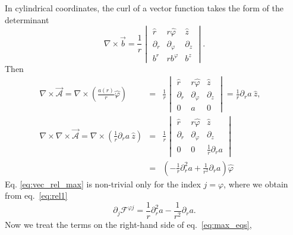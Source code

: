 In cylindrical coordinates, the curl of a vector function takes the form of the determinant \cite{Arfken}
\begin{equation}
	\nabla\times\vec{b} = \frac{1}{r}\begin{vmatrix}
	\hat{r} & r{\hat{\varphi}} & \hat{z} \\
	\partial_r & \partial_{\varphi} & \partial_z \\
	b^r & rb^{\varphi} & b^z 
	\end{vmatrix}.
\end{equation}
Then
\begin{eqnarray}
	\nabla\times\vec{\mathcal{A}} = \nabla\times\left( \frac{a(r)}{r}\hat{\varphi}\right) & = & \frac{1}{r} \begin{vmatrix}
	\hat{r} & r\hat{\varphi} & \hat{z} \\
	\partial_r & \partial_{\varphi} & \partial_z \\
	0 & a & 0
	\end{vmatrix} = \frac{1}{r}\partial_r a \ \hat{z}, \nonumber \quad\\
	\nabla \times \nabla \times \vec{\mathcal{A}} = \nabla \times \left(\frac{1}{r}\partial_r a \ \hat{z}\right) & = & \frac{1}{r}\begin{vmatrix}
	\hat{r} & r\hat{\varphi} & \hat{z} \\
	\partial_r & \partial_{\varphi} & \partial_z \\
	\label{eq:rel1}
	0 & 0 & \frac{1}{r}\partial_r a 
	\end{vmatrix}\nonumber \\
	& = & \left(-\frac{1}{r}\partial_r^2 a + \frac{1}{r^2}\partial_r a\right)\hat{\varphi} \quad
\end{eqnarray}
Eq. \eqref{eq:vec_rel_max} is non-trivial only for the index $j = \varphi$, where we obtain from eq.\ \eqref{eq:rel1}
\begin{equation}
	\label{eq:max_eqs_phi}
	\partial_j\mathcal{F}^{\varphi j} = \frac{1}{r}\partial_r^2 a - \frac{1}{r^2}\partial_r a.
\end{equation}
Now we treat the terms on the right-hand side of eq.\ \eqref{eq:max_eqs},
